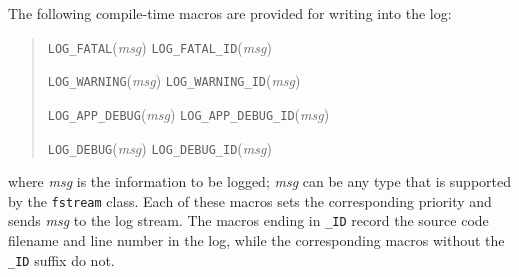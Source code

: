 The following compile-time macros are provided for writing
into the log:
\begin{quote}
\lstinline|LOG_FATAL|({\em msg})
\lstinline|LOG_FATAL_ID|({\em msg})

\lstinline|LOG_WARNING|({\em msg})
\lstinline|LOG_WARNING_ID|({\em msg})

\lstinline|LOG_APP_DEBUG|({\em msg})
\lstinline|LOG_APP_DEBUG_ID|({\em msg})

\lstinline|LOG_DEBUG|({\em msg})
\lstinline|LOG_DEBUG_ID|({\em msg})
\end{quote}
where \emph{msg} is the information to be logged; \emph{msg} can be
any type that is supported by the \CPP{} \lstinline|fstream| class.
Each of these macros sets the corresponding priority and sends
\emph{msg} to the log stream. The macros ending in \lstinline|_ID|
record the source code filename and line number in the log, while the
corresponding macros without the \lstinline|_ID| suffix do not.






